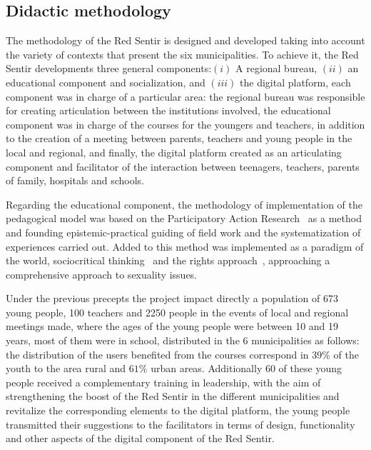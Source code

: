 \documentclass[journal,transmag]{IEEEtran}
\begin{document}
\subsection{Didactic methodology}

The methodology of the Red Sentir is designed and developed taking into account the variety of contexts that present the six municipalities. To achieve it, the Red Sentir developments three general components:$(i)$ A regional bureau, $(ii)$ an educational component and socialization, and $(iii)$ the digital platform, each component was in charge of a particular area: the regional bureau was responsible for creating articulation between the institutions involved, the educational component was in charge of the courses for the youngers and teachers, in addition to the creation of a meeting between parents, teachers and young people in the local and regional, and finally, the digital platform created as an articulating component and facilitator of the interaction between teenagers, teachers, parents of family, hospitals and schools.

Regarding the educational component, the methodology of implementation of the pedagogical model was based on the Participatory Action Research~\cite{fals2008socialismo} as a method and founding epistemic-practical guiding of field work and the systematization of experiences carried out. Added to this method was implemented as a paradigm of the world, sociocritical thinking~\cite{stanley1991postmodern} and the rights approach~\cite{unesco}, approaching a comprehensive approach to sexuality issues.

Under the previous precepts the project impact directly a population of 673 young people, 100 teachers and 2250 people in the events of local and regional meetings made, where the ages of the young people were between 10 and 19 years, most of them were in school, distributed in the 6 municipalities as follows: the distribution of the users benefited from the courses correspond in $39\%$ of the youth to the area rural and $61\%$ urban areas. Additionally 60 of these young people received a complementary training in leadership, with the aim of strengthening the boost of the Red Sentir in the different municipalities and revitalize the corresponding elements to the digital platform, the young people transmitted their suggestions to the facilitators in terms of design, functionality and other aspects of the digital component of the Red Sentir.
\end{document}
